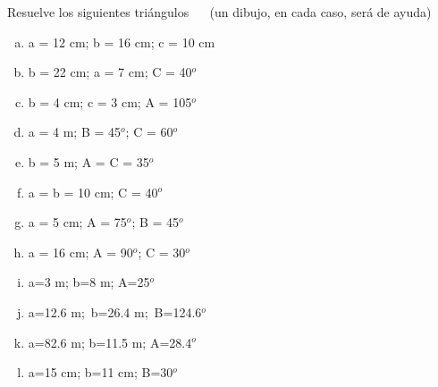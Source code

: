 \vspace{1.5cm}%
\begin{mipropuesto}

Resuelve los siguientes triángulos $\quad$ \textcolor{gris}{(un dibujo, en cada caso, será de ayuda)}

\begin{multicols}{2}
\begin{enumerate}[a) ]
\item  a = 12 cm; b = 16 cm; c = 10 cm
\item  b = 22 cm; a = 7 cm; C = 40$^o$
\item  b = 4 cm; c = 3 cm; A = 105$^o$
\item  a = 4 m; B = 45$^o$; C = 60$^o$
\item  b = 5 m; A = C = 35$^o$
\item  a = b = 10 cm; C = 40$^o$
\item  a = 5 cm; A = 75$^o$; B = 45$^o$
\item  a = 16 cm; A = 90$^o$; C = 30$^o$
\item  a=3 m; b=8 m; A=25$^o$
\item  a=12.6 m;\ b=26.4 m;\ B=124.6$^o$
\item  a=82.6 m; b=11.5 m; A=28.4$^o$
\item  a=15 cm; b=11 cm; B=30$^o$
\end{enumerate}
\end{multicols}
	
\end{mipropuesto}
\vspace{-8mm}
\begin{flushright}
\begin{footnotesize} \textcolor{gris}{}	\end{footnotesize}
\end{flushright}

\vspace{-10mm}
\begin{flushright}
\begin{footnotesize} \textcolor{gris}{}	\end{footnotesize}
\end{flushright}

\vspace{-10mm}
\begin{flushright}
\begin{footnotesize} \textcolor{gris}{}	\end{footnotesize}
\end{flushright}


